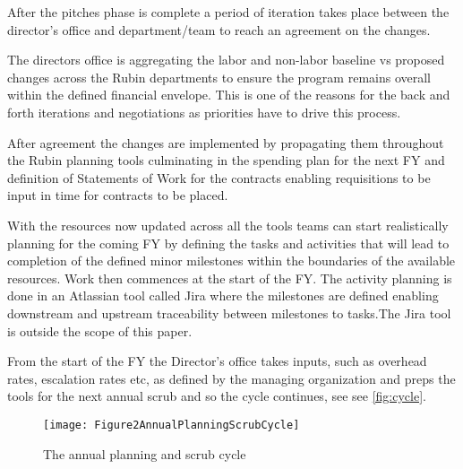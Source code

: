 After the pitches phase is complete a period of iteration takes place between the director’s office and department/team to reach an agreement on the changes.

The directors office is aggregating the labor and non-labor baseline vs proposed changes across the Rubin departments to ensure the program remains overall within the defined financial envelope. This is one of the reasons for the back and forth iterations and negotiations as priorities have to drive this process.

After agreement the changes are implemented by propagating them throughout the Rubin planning tools culminating in the spending plan for the next FY and definition of Statements of Work for the contracts enabling requisitions to be input in time for contracts to be placed.

With the resources now updated across all the tools teams can start realistically planning for the coming FY by defining the tasks and activities that will lead to completion of the defined minor milestones within the boundaries of the available resources. Work then commences at the start of the FY. The activity planning is done in an Atlassian tool called Jira where the milestones are defined enabling downstream and upstream traceability between milestones to tasks.The Jira tool is outside the scope of this paper.

From the start of the FY the Director’s office takes inputs, such as overhead rates, escalation rates etc, as defined by the managing organization and preps the tools for the next annual scrub and so the cycle continues, see see \autoref{fig:cycle}.


\begin{figure}[h!]
\begin{centering}
\texttt{[image: Figure2AnnualPlanningScrubCycle]}
	\caption{The annual planning and scrub cycle
\label{fig:cycle}}
\end{centering}
\end{figure}
